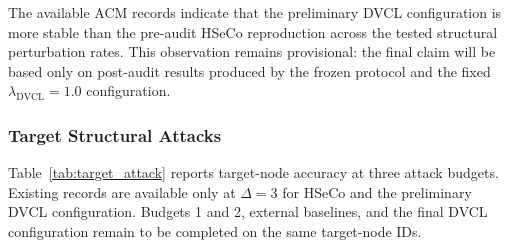 \begin{table}[htbp]
\centering
\small
\caption{Accuracy on ACM under HetePRBCD. Values currently present are preliminary five-seed records.}
\label{tab:acm_heteprbcd}
\end{table}

The available ACM records indicate that the preliminary DVCL configuration is more stable than the pre-audit HSeCo reproduction across the tested structural perturbation rates. This observation remains provisional: the final claim will be based only on post-audit results produced by the frozen protocol and the fixed $\lambda_{\mathrm{DVCL}}=1.0$ configuration.

\subsubsection{Target Structural Attacks}

Table~\ref{tab:target_attack} reports target-node accuracy at three attack budgets. Existing records are available only at $\Delta=3$ for HSeCo and the preliminary DVCL configuration. Budgets 1 and 2, external baselines, and the final DVCL configuration remain to be completed on the same target-node IDs.

